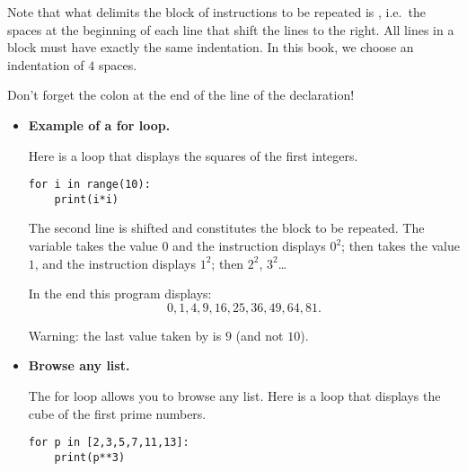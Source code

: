 \documentclass[11pt,class=report,crop=false]{standalone}
\begin{document}
\begin{cours}





Note that what delimits the block of instructions to be repeated is , i.e.~the spaces at the beginning of each line that shift the lines to the right.
All lines in a block must have exactly the same indentation. In this book, we choose an indentation of $4$ spaces.

Don't forget the colon \og{}\ci{:}\fg{} at the end of the line of the  declaration!

\begin{itemize}
  \item \textbf{Example of a \og{}for\fg{} loop.}

Here is a loop that displays the squares of the first integers. 
\begin{center}
\begin{minipage}{0.5\textwidth} 
\begin{lstlisting}
for i in range(10):
    print(i*i)
\end{lstlisting}
\end{minipage}
\end{center} 
The second line is shifted and constitutes the block to be repeated.
The variable  takes the value $0$ and the instruction displays $0^2$;
then  takes the value $1$, and the instruction displays $1^2$; then $2^2$, $3^2$\ldots

In the end this program displays:
$$0,1,4,9,16,25,36,49,64,81.$$

Warning: the last value taken by  is $9$ (and not $10$).

  \item \textbf{Browse any list.}
  
The \og{}for\fg{} loop allows you to browse any list. Here is a loop that displays the cube of the first prime numbers.
\begin{center}
\begin{minipage}{0.5\textwidth} 
\begin{lstlisting}
for p in [2,3,5,7,11,13]:
    print(p**3)
\end{lstlisting}
\end{minipage}
\end{center} 


\end{itemize}
\end{cours}
\end{document}
